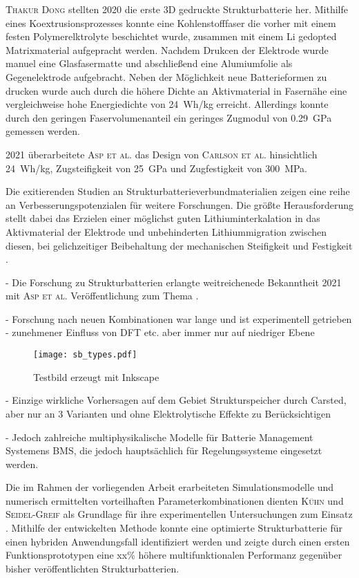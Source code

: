 \textsc{Thakur Dong} \cite{Thakur2020} stellten 2020 die erste 3D gedruckte Strukturbatterie her. Mithilfe eines Koextrusionsprozesses konnte eine Kohlenstofffaser die vorher mit einem festen Polymerelktrolyte beschichtet wurde, zusammen mit einem Li gedopted Matrixmaterial aufgepracht werden. Nachdem Drukcen der Elektrode wurde manuel eine Glasfasermatte und abschließend eine Alumiumfolie als Gegenelektrode aufgebracht. Neben der Möglichkeit neue Batterieformen zu drucken wurde auch durch die höhere Dichte an Aktivmaterial in Fasernähe eine vergleichweise hohe Energiedichte von 24~Wh/kg erreicht. Allerdings konnte durch den geringen Faservolumenanteil ein geringes Zugmodul von 0.29~GPa gemessen werden.

2021 überarbeitete  \textsc{Asp et al.} \cite{Asp2021} das Design von \textsc{Carlson et al.} hinsichtlich   24~Wh/kg, Zugsteifigkeit von 25~GPa und Zugfestigkeit von 300~MPa.

Die exitierenden Studien an Strukturbatterieverbundmaterialien zeigen eine reihe an Verbesserungspotenzialen für weitere Forschungen. Die größte Herausforderung stellt dabei das Erzielen einer möglichst guten Lithiuminterkalation in das Aktivmaterial der Elektrode und unbehinderten Lithiummigration zwischen diesen, bei gelichzeitiger Beibehaltung der mechanischen Steifigkeit und Festigkeit \cite{Asp2015}.

- Die Forschung zu Strukturbatterien erlangte weitreichenede Bekanntheit 2021 mit \textsc{Asp et al.} Veröffentlichung zum Thema \textit{}.


- Forschung nach neuen Kombinationen war lange und ist experimentell getrieben
- zunehmener Einfluss von DFT etc. aber immer nur auf niedriger Ebene

\begin{figure}[h]
        \center
	\texttt{[image: sb\_types.pdf]}
		\caption{\label{fig:sb_types}Testbild erzeugt mit Inkscape}
\end{figure}

- Einzige wirkliche Vorhersagen auf dem Gebiet Strukturspeicher durch Carsted, aber nur an 3 Varianten und ohne Elektrolytische Effekte zu Berücksichtigen 

- Jedoch zahlreiche multiphysikalische Modelle für Batterie Management Systemens BMS, die jedoch hauptsächlich für Regelungssysteme eingesetzt werden.

Die im Rahmen der vorliegenden Arbeit erarbeiteten Simulationsmodelle und numerisch ermittelten vorteilhaften Parameterkombinationen dienten \textsc{Kühn} und \textsc{Seidel-Greif} als Grundlage für ihre experimentellen Untersuchungen zum Einsatz .
Mithilfe der entwickelten Methode konnte eine optimierte  Strukturbatterie für einen hybriden Anwendungsfall identifiziert werden und zeigte durch einen ersten Funktionsprototypen eine xx\% höhere multifunktionalen Performanz gegenüber bisher veröffentlichten Strukturbatterien.









   

